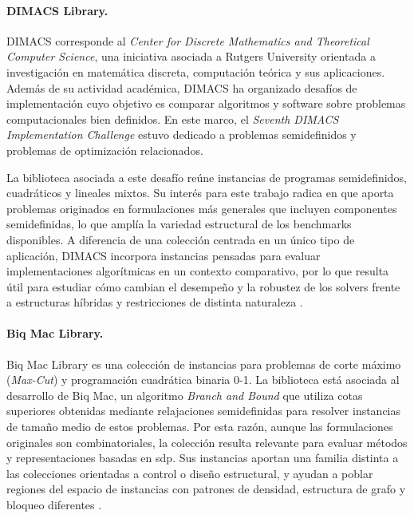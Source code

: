 \paragraph{DIMACS Library.}
\label{subsec:benchmark_dimacs}

DIMACS corresponde al \textit{Center for Discrete Mathematics and Theoretical Computer
Science}, una iniciativa asociada a Rutgers University orientada a investigación en matemática
discreta, computación teórica y sus aplicaciones. Además de su actividad académica, DIMACS ha
organizado desafíos de implementación cuyo objetivo es comparar algoritmos y software sobre
problemas computacionales bien definidos. En este marco, el \textit{Seventh DIMACS
Implementation Challenge} estuvo dedicado a problemas semidefinidos y problemas de
optimización relacionados.

La biblioteca asociada a este desafío reúne instancias de programas semidefinidos,
cuadráticos y lineales mixtos. Su interés para este trabajo radica en que aporta problemas
originados en formulaciones más generales que incluyen componentes semidefinidas, lo que amplía
la variedad estructural de los benchmarks disponibles. A diferencia de una colección centrada en
un único tipo de aplicación, DIMACS incorpora instancias pensadas para evaluar implementaciones
algorítmicas en un contexto comparativo, por lo que resulta útil para estudiar cómo cambian el
desempeño y la robustez de los solvers frente a estructuras híbridas y restricciones de distinta
naturaleza \cite{DIMACSLibraryMixeda}.

\paragraph{Biq Mac Library.}
\label{subsec:benchmark_biqmac}

Biq Mac Library es una colección de instancias para problemas de corte máximo
(\textit{Max-Cut}) y programación cuadrática binaria 0-1. La biblioteca está asociada al
desarrollo de Biq Mac, un algoritmo \textit{Branch and Bound} que utiliza cotas superiores
obtenidas mediante relajaciones semidefinidas para resolver instancias de tamaño medio de estos
problemas. Por esta razón, aunque las formulaciones originales son combinatoriales, la colección
resulta relevante para evaluar métodos y representaciones basadas en \acrshort{sdp}. Sus
instancias aportan una familia distinta a las colecciones orientadas a control o diseño
estructural, y ayudan a poblar regiones del espacio de instancias con patrones de densidad,
estructura de grafo y bloqueo diferentes \cite{BiqMacLibrarya}.

